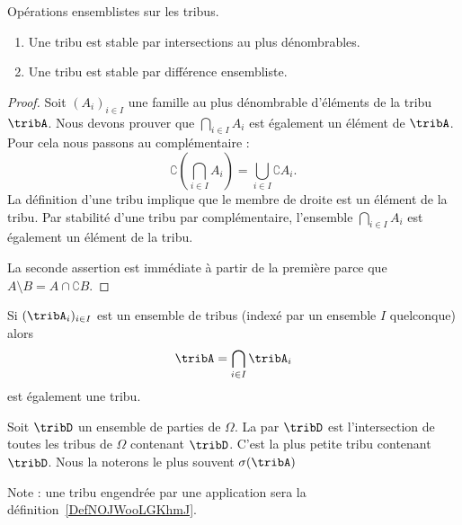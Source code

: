 \begin{lemma}   \label{LemBWNlKfA}
    Opérations ensemblistes sur les tribus.
    \begin{enumerate}
        \item
    Une tribu est stable par intersections au plus dénombrables.
\item       \label{ItemXQVLooFGBQNj}
    Une tribu est stable par différence ensembliste.
    \end{enumerate}
\end{lemma}

\begin{proof}
    Soit \( (A_i)_{i\in I}\) une famille au plus dénombrable d'éléments de la tribu \( \tribA\). Nous devons prouver que \( \bigcap_{i\in I}A_i\) est également un élément de \( \tribA\). Pour cela nous passons au complémentaire :
    \begin{equation}
        \complement\left( \bigcap_{i\in I}A_i \right)=\bigcup_{i\in I}\complement A_i.
    \end{equation}
    La définition d'une tribu implique que le membre de droite est un élément de la tribu. Par stabilité d'une tribu par complémentaire, l'ensemble \( \bigcap_{i\in I}A_i\) est également un élément de la tribu.

    La seconde assertion est immédiate à partir de la première parce que \( A\setminus B=A\cap \complement B\).
\end{proof}

Si \( (\tribA_i)_{i\in I}\) est un ensemble de tribus (indexé par un ensemble \( I\) quelconque) alors
\begin{equation}
    \tribA=\bigcap_{i\in I}\tribA_i
\end{equation}
est également une tribu.

\begin{definition}
    Soit \( \tribD\) un ensemble de parties de \( \Omega\). La  par \( \tribD\) est l'intersection de toutes les tribus de \( \Omega\) contenant \( \tribD\). C'est la plus petite tribu contenant \( \tribD\). Nous la noterons le plus souvent \( \sigma(\tribA)\)
\end{definition}

Note : une tribu engendrée par une application sera la définition~\ref{DefNOJWooLGKhmJ}.

